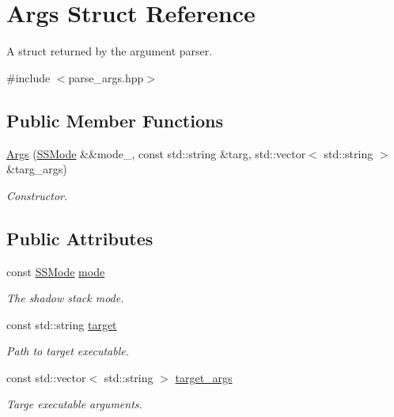 \hypertarget{struct_args}{\section{Args Struct Reference}
\label{struct_args}
}


A struct returned by the argument parser.  




{\ttfamily \#include $<$parse\-\_\-args.\-hpp$>$}

\subsection*{Public Member Functions}
\begin{DoxyCompactItemize}
\item 
\hyperlink{struct_args_a84627d98452f42aaed06fd75f1b659df}{Args} (\hyperlink{struct_s_s_mode}{S\-S\-Mode} \&\&mode\-\_\-, const std\-::string \&targ, std\-::vector$<$ std\-::string $>$ \&targ\-\_\-args)
\begin{DoxyCompactList}\small\item\em Constructor. \end{DoxyCompactList}\end{DoxyCompactItemize}
\subsection*{Public Attributes}
\begin{DoxyCompactItemize}
\item 
const \hyperlink{struct_s_s_mode}{S\-S\-Mode} \hyperlink{struct_args_ab0be2adf6b41e1aa9803a6f2ea6fc6b2}{mode}
\begin{DoxyCompactList}\small\item\em The shadow stack mode. \end{DoxyCompactList}\item 
const std\-::string \hyperlink{struct_args_a49f5255b7466ee4e1329aa32ca069da6}{target}
\begin{DoxyCompactList}\small\item\em Path to target executable. \end{DoxyCompactList}\item 
const std\-::vector$<$ std\-::string $>$ \hyperlink{struct_args_aa9f8e387df0b3691352daf352876176d}{target\-\_\-args}
\begin{DoxyCompactList}\small\item\em Targe executable arguments. \end{DoxyCompactList}\end{DoxyCompactItemize}


